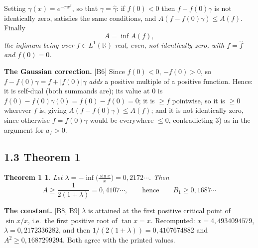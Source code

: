 \documentclass[11pt,reqno]{amsart}
\theoremstyle{plain}
\newtheorem*{thmA}{Theorem 1}
\theoremstyle{definition}
\theoremstyle{remark}
\newcommand{\R}{\mathbb{R}}
\newcommand{\fh}{\widehat{f}}
\newcommand{\Ledger}[1]{{\scriptsize\textsf{[#1]}}}
\begin{document}
Setting $\gamma(x)=e^{-\pi x^2}$, so that $\gamma=\widehat\gamma$: if $f(0)<0$ then
$f-f(0)\gamma$ is not identically zero, satisfies the same conditions, and
$A(f-f(0)\gamma)\le A(f)$. Finally
\begin{equation}\label{eq:11}
 A=\inf A(f),
\end{equation}
\emph{the infimum being over $f\in L^1(\R)$ real, even, not identically zero, with
$f=\fh$ and $f(0)=0$.}

\begin{expansion}
\textbf{The Gaussian correction.} \Ledger{B6} Since $f(0)<0$, $-f(0)>0$, so
$f-f(0)\gamma=f+|f(0)|\gamma$ \emph{adds} a positive multiple of a positive function.
Hence: it is self-dual (both summands are); its value at $0$ is
$f(0)-f(0)\gamma(0)=f(0)-f(0)=0$; it is $\ge f$ pointwise, so it is $\ge0$ wherever
$f$ is, giving $A(f-f(0)\gamma)\le A(f)$; and it is not identically zero, since
otherwise $f=f(0)\gamma$ would be everywhere $\le0$, contradicting 3) as in the
argument for $a_f>0$.
\end{expansion}

\subsection*{1.3 Theorem 1}

\begin{thmA}
Let $\lambda=-\inf\bigl(\tfrac{\sin x}{x}\bigr)=0{,}2172\cdots$. Then
\[A\ge\frac{1}{2(1+\lambda)}=0{,}4107\cdots,\qquad\text{hence}\qquad
  B_1\ge0{,}1687\cdots\]
\end{thmA}

\begin{expansion}
\textbf{The constant.} \Ledger{B8, B9} $\lambda$ is attained at the first positive
critical point of $\sin x/x$, i.e.\ the first positive root of $\tan x=x$.
Recomputed: $x=4{,}4934094579$, $\lambda=0{,}2172336282$, and then
$1/(2(1+\lambda))=0{,}4107674882$ and $A^2\ge0{,}1687299294$. Both agree with the
printed values.
\end{expansion}
\end{document}

